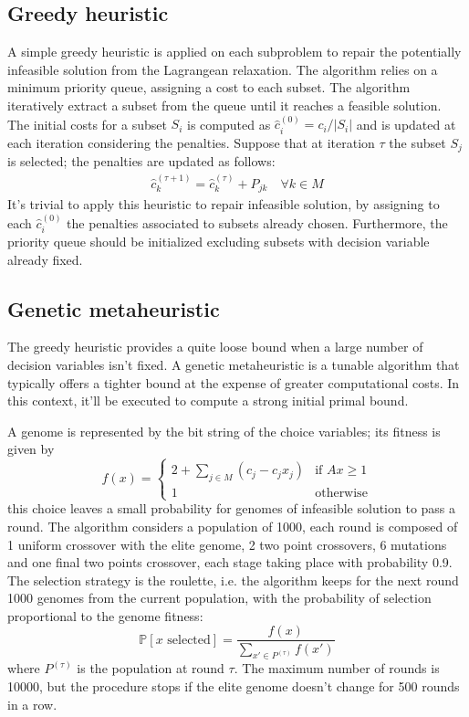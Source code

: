 \documentclass[a4paper]{article}
\begin{document}
\subsection{Greedy heuristic}
A simple greedy heuristic is applied on each subproblem to repair the potentially infeasible solution from the Lagrangean relaxation. The algorithm relies on a minimum priority queue, assigning a cost to each subset. The algorithm iteratively extract a subset from the queue until it reaches a feasible solution. The initial costs for a subset $S_i$ is computed as $\hat c_i^{(0)} = c_i/|S_i|$ and is updated at each iteration considering the penalties. Suppose that at iteration $\tau$ the subset $S_j$ is selected; the penalties are updated as follows:
\begin{align*}
	\hat c_k^{(\tau+1)} = \hat c_k^{(\tau)} + P_{jk} \quad \forall k \in M	
\end{align*}
It's trivial to apply this heuristic to repair infeasible solution, by assigning to each $\hat c_i^{(0)}$ the penalties associated to subsets already chosen. Furthermore, the priority queue should be initialized excluding subsets with decision variable already fixed.

\subsection{Genetic metaheuristic}
The greedy heuristic provides a quite loose bound when a large number of decision variables isn't fixed. A genetic metaheuristic is a tunable algorithm that typically offers a tighter bound at the expense of greater computational costs. In this context, it'll be executed to compute a strong initial primal bound.

A genome is represented by the bit string of the choice variables; its fitness is given by
$$
f(x) = 
\begin{cases}
	2 + \sum_{j\in M} (c_j - c_j x_j) & \text{if } Ax \geq 1\\
	1 & \text{otherwise}
\end{cases}
$$
this choice leaves a small probability for genomes of infeasible solution to pass a round. The algorithm considers a population of 1000, each round is composed of 1 uniform crossover with the elite genome, 2 two point crossovers, 6 mutations and one final two points crossover, each stage taking place with probability 0.9. The selection strategy is the roulette, i.e. the algorithm keeps for the next round 1000 genomes from the current population, with the probability of selection proportional to the genome fitness:
$$
\mathbb{P}[x \text{ selected}] = \frac{f(x)}{\sum_{x' \in P^{(\tau)}}f(x')}
$$
where $P^{(\tau)}$ is the population at round $\tau$.
The maximum number of rounds is 10000, but the procedure stops if the elite genome doesn't change for 500 rounds in a row.
\end{document}
